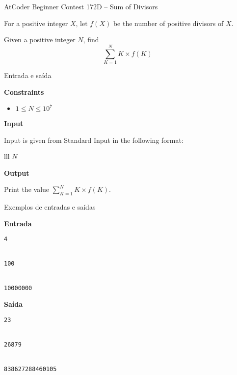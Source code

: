 \begin{frame}[fragile]{AtCoder Beginner Contest 172D -- Sum of Divisors}

    For a positive integer $X$, let $f(X)$ be the number of positive divisors of $X$.

    Given a positive integer $N$, find
    $$
        \sum_{K = 1}^N  K\times f(K)
    $$

\end{frame}

\begin{frame}[fragile]{Entrada e saída}

\textbf{Constraints}

\begin{itemize}
    \item $1 \leq N \leq 10^7$
\end{itemize}

\vspace{0.1in}

\textbf{Input}

Input is given from Standard Input in the following format:
\begin{atcoderio}{lll}
$N$ \\
\end{atcoderio}

\textbf{Output}

Print the value $\sum_{K = 1}^N  K\times f(K)$.
\end{frame}

\begin{frame}[fragile]{Exemplos de entradas e saídas}

\begin{minipage}[t]{0.45\textwidth}
\textbf{Entrada}
\begin{verbatim}
4


100


10000000
\end{verbatim}
\end{minipage}
\begin{minipage}[t]{0.5\textwidth}
\textbf{Saída}
\begin{verbatim}
23


26879


838627288460105
\end{verbatim}
\end{minipage}
\end{frame}


